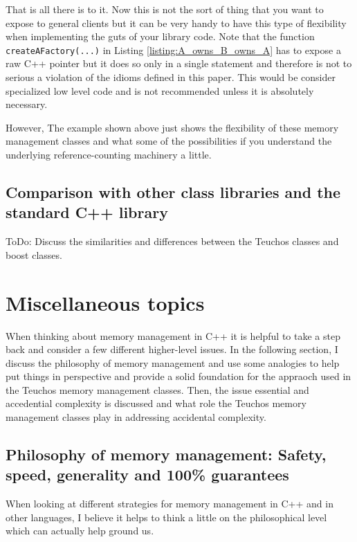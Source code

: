\documentclass[pdf,ps2pdf,11pt]{SANDreport}
\begin{document}
That is all there is to it.  Now this is not the sort of thing that
you want to expose to general clients but it can be very handy to have
this type of flexibility when implementing the guts of your library
code.  Note that the function {}\texttt{createAFactory(...)} in
Listing {}\ref{listing:A_owns_B_owns_A} has to expose a raw C++
pointer but it does so only in a single statement and therefore is not
to serious a violation of the idioms defined in this paper.  This
would be consider specialized low level code and is not recommended
unless it is absolutely necessary.

However, The example shown above just shows the flexibility of these
memory management classes and what some of the possibilities if you
understand the underlying reference-counting machinery a little.


%
{}\subsection{Comparison with other class libraries and the standard
C++ library}
%

ToDo: Discuss the similarities and differences between the Teuchos
classes and boost classes.


%
{}\section{Miscellaneous topics}
%

When thinking about memory management in C++ it is helpful to take a
step back and consider a few different higher-level issues.  In the
following section, I discuss the philosophy of memory management and
use some analogies to help put things in perspective and provide a
solid foundation for the appraoch used in the Teuchos memory
management classes.  Then, the issue essential and accedential
complexity is discussed and what role the Teuchos memory management
classes play in addressing accidental complexity.


%
{}\subsection{Philosophy of memory management: Safety, speed,
generality and 100\% guarantees}
\label{sec:phylosophy-of-mem-mng}
%

When looking at different strategies for memory management in C++ and
in other languages, I believe it helps to think a little on the
philosophical level which can actually help ground us.
\end{document}
